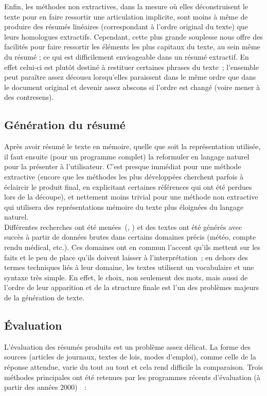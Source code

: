 \documentclass[a4paper, 12pt]{article}
\begin{document}
Enfin, les méthodes non extractives, dans la mesure où elles déconstruisent le texte pour en faire ressortir une articulation implicite, sont moins à même de produire des résumés linéaires (correspondant à l'ordre original du texte) que leurs homologues extractifs. Cependant, cette plus grande souplesse nous offre des facilités pour faire ressortir les éléments les plus capitaux du texte, au sein même du résumé ; ce qui est difficilement envisageable dans un résumé extractif. En effet celui-ci est plutôt destiné à restituer certaines phrases du texte~; l'ensemble peut paraître assez décousu lorsqu'elles paraissent dans le même ordre que dans le document original et devenir assez abscons si l'ordre est changé (voire mener à des contresens).

\subsection{Génération du résumé}

Après avoir résumé le texte en mémoire, quelle que soit la représentation utilisée, il faut ensuite (pour un programme complet) la reformuler en langage naturel pour la présenter à l'utilisateur. C'est presque immédiat pour une méthode extractive (encore que les méthodes les plus développées cherchent parfois à éclaircir le produit final, en explicitant certaines références qui ont été perdues lors de la découpe), et nettement moins trivial pour une méthode non extractive qui utilisera des représentations mémoire du texte plus éloignées du langage naturel.\\

Différentes recherches ont été menées~(\cite{danlos_generation_2000}, \cite{horacek_building_2001}) et des textes ont été générés avec succès à partir de données brutes dans certains domaines précis (météo, compte rendu médical, etc.). Ces domaines ont en commun l'accent qu'ils mettent sur les faits et le peu de place qu'ils doivent laisser à l'interprétation~; en dehors des termes techniques liés à leur domaine, les textes utilisent un vocabulaire et une syntaxe très simple. En effet, le choix, non seulement des mots, mais aussi de l'ordre de leur apparition et de la structure finale est l'un des problèmes majeurs de la génération de texte.

\subsection{Évaluation}

L'évaluation des résumés produits est un problème assez délicat. La forme des sources (articles de journaux, textes de lois, modes d'emploi), comme celle de la réponse attendue, varie du tout au tout et cela rend difficile la comparaison. Trois méthodes principales ont été retenues par les programmes récents d'évaluation (à partir des années 2000)~\cite[p.1453-1461]{jones_automatic_2007}~:
\end{document}

